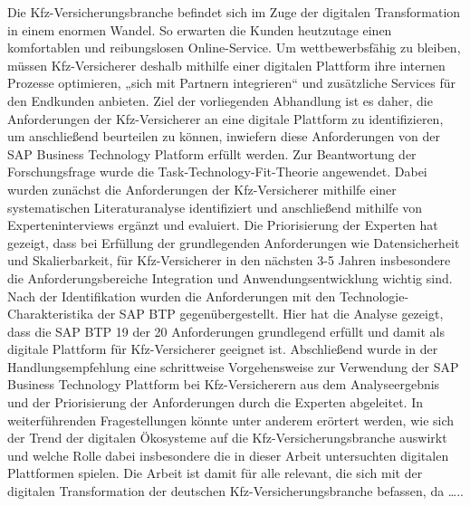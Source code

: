 Die Kfz-Versicherungsbranche befindet sich im Zuge der digitalen Transformation in einem enormen Wandel. So erwarten die Kunden heutzutage einen komfortablen und reibungslosen Online-Service. Um wettbewerbsfähig zu bleiben, müssen Kfz-Versicherer deshalb mithilfe einer digitalen Plattform ihre internen Prozesse optimieren, „sich mit Partnern integrieren“ und zusätzliche Services für den Endkunden anbieten. 
Ziel der vorliegenden Abhandlung ist es daher, die Anforderungen der Kfz-Versicherer an eine digitale Plattform zu identifizieren, um anschließend beurteilen zu können, inwiefern diese Anforderungen von der SAP Business Technology Platform erfüllt werden.
Zur Beantwortung der Forschungsfrage wurde die Task-Technology-Fit-Theorie angewendet. Dabei wurden zunächst die Anforderungen der Kfz-Versicherer mithilfe einer systematischen Literaturanalyse identifiziert und anschließend mithilfe von Experteninterviews ergänzt und evaluiert. Die Priorisierung der Experten hat gezeigt, dass bei Erfüllung der grundlegenden Anforderungen wie Datensicherheit und Skalierbarkeit, für Kfz-Versicherer in den nächsten 3-5 Jahren insbesondere die Anforderungsbereiche Integration und Anwendungsentwicklung wichtig sind. Nach der Identifikation wurden die Anforderungen mit den Technologie-Charakteristika der SAP BTP gegenübergestellt. Hier hat die Analyse gezeigt, dass die SAP BTP 19 der 20 Anforderungen grundlegend erfüllt und damit als digitale Plattform für Kfz-Versicherer geeignet ist. Abschließend wurde in der Handlungsempfehlung eine schrittweise Vorgehensweise zur Verwendung der SAP Business Technology Plattform bei Kfz-Versicherern aus dem Analyseergebnis und der Priorisierung der Anforderungen durch die Experten abgeleitet. In weiterführenden Fragestellungen könnte unter anderem erörtert werden, wie sich der Trend der digitalen Ökosysteme auf die Kfz-Versicherungsbranche auswirkt und welche Rolle dabei insbesondere die in dieser Arbeit untersuchten digitalen Plattformen spielen.
Die Arbeit ist damit für alle relevant, die sich mit der digitalen Transformation der deutschen Kfz-Versicherungsbranche befassen, da …..






